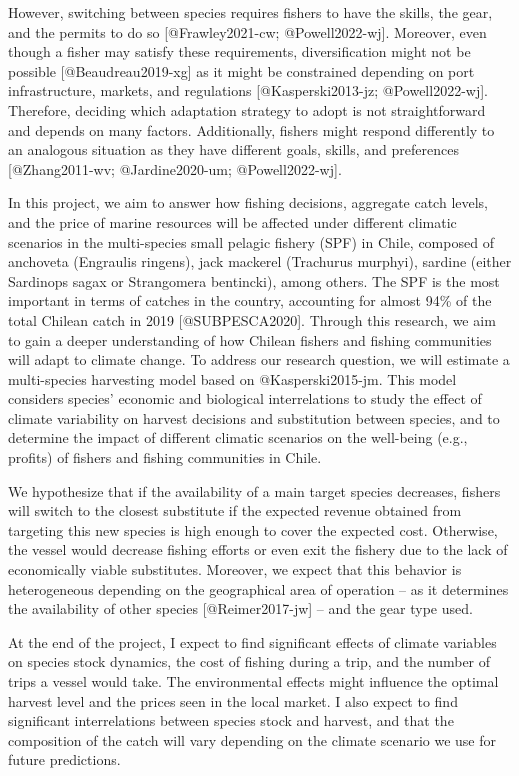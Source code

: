 However, switching between species requires fishers to have the skills,
the gear, and the permits to do so {[}@Frawley2021-cw;
@Powell2022-wj{]}. Moreover, even though a fisher may satisfy these
requirements, diversification might not be possible
{[}@Beaudreau2019-xg{]} as it might be constrained depending on port
infrastructure, markets, and regulations {[}@Kasperski2013-jz;
@Powell2022-wj{]}. Therefore, deciding which adaptation strategy to
adopt is not straightforward and depends on many factors. Additionally,
fishers might respond differently to an analogous situation as they have
different goals, skills, and preferences {[}@Zhang2011-wv;
@Jardine2020-um; @Powell2022-wj{]}.

In this project, we aim to answer how fishing decisions, aggregate catch
levels, and the price of marine resources will be affected under
different climatic scenarios in the multi-species small pelagic fishery
(SPF) in Chile, composed of anchoveta (Engraulis ringens), jack mackerel
(Trachurus murphyi), sardine (either Sardinops sagax or Strangomera
bentincki), among others. The SPF is the most important in terms of
catches in the country, accounting for almost 94\% of the total Chilean
catch in 2019 {[}@SUBPESCA2020{]}. Through this research, we aim to gain
a deeper understanding of how Chilean fishers and fishing communities
will adapt to climate change. To address our research question, we will
estimate a multi-species harvesting model based on @Kasperski2015-jm.
This model considers species' economic and biological interrelations to
study the effect of climate variability on harvest decisions and
substitution between species, and to determine the impact of different
climatic scenarios on the well-being (e.g., profits) of fishers and
fishing communities in Chile.

We hypothesize that if the availability of a main target species
decreases, fishers will switch to the closest substitute if the expected
revenue obtained from targeting this new species is high enough to cover
the expected cost. Otherwise, the vessel would decrease fishing efforts
or even exit the fishery due to the lack of economically viable
substitutes. Moreover, we expect that this behavior is heterogeneous
depending on the geographical area of operation -- as it determines the
availability of other species {[}@Reimer2017-jw{]} -- and the gear type
used.

At the end of the project, I expect to find significant effects of
climate variables on species stock dynamics, the cost of fishing during
a trip, and the number of trips a vessel would take. The environmental
effects might influence the optimal harvest level and the prices seen in
the local market. I also expect to find significant interrelations
between species stock and harvest, and that the composition of the catch
will vary depending on the climate scenario we use for future
predictions.

